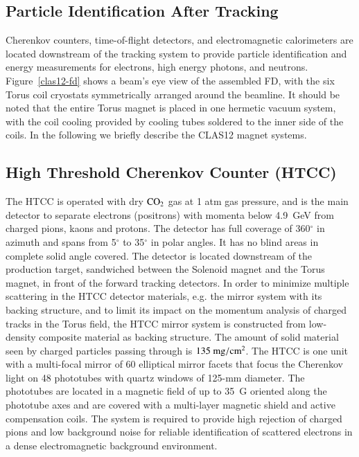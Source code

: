 \documentclass[final,3p,twocolumn]{elsarticle}
\begin{document}
\subsection{Particle Identification After Tracking}

Cherenkov counters, time-of-flight detectors,  
and electromagnetic calorimeters are located  downstream of the tracking system to provide particle identification and energy measurements for 
electrons, high energy photons, and neutrons.  Figure~\ref{clas12-fd} shows a beam's eye view of the assembled FD, with the
six Torus coil cryostats symmetrically arranged around the beamline. It should be noted that the entire Torus magnet is 
placed in one hermetic vacuum system, with the coil cooling provided by cooling tubes soldered to the inner side of the coils.  
In the following we briefly describe the CLAS12 magnet systems. 

\subsection{High Threshold Cherenkov Counter (HTCC)}
\label{}

The HTCC is operated with dry $\rm CO_2$ gas at 1 atm gas pressure, and is the main detector to 
separate electrons (positrons) with momenta below 4.9~GeV from charged pions, kaons and protons. 
The detector has full coverage of 360$^\circ$ in azimuth and spans from 5$^\circ$ to 35$^\circ$ in polar angles.
It has no blind areas in complete solid angle covered. The detector is located downstream of the production target, 
sandwiched between the Solenoid magnet and the Torus magnet, in front of the forward tracking detectors. 
In order to minimize multiple scattering in the HTCC detector materials, e.g. the mirror system with its 
backing structure, and to limit its impact on the momentum analysis of charged tracks in the Torus field,
the HTCC mirror system is constructed from low-density composite material as backing structure. 
The amount of solid material seen by charged particles passing through is $135~\rm{mg/cm^2}$. 
The HTCC is one unit with a 
multi-focal mirror of 60 elliptical mirror facets that focus the Cherenkov light on 48  
phototubes with quartz windows of 125-mm diameter. The phototubes are located in a magnetic field 
of up to 35~G oriented along 
the phototube axes and are covered with a multi-layer magnetic shield and active compensation coils. 
The system is required to provide high rejection of charged pions and low background noise for reliable 
identification of scattered electrons in a dense electromagnetic background environment. 
\end{document}
